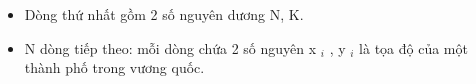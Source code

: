 \begin{itemize}
	\item Dòng thứ nhất gồm 2 số nguyên dương N, K.
	\item N dòng tiếp theo: mỗi dòng chứa 2 số nguyên x $_ i $ , y $_ i $ là tọa độ của một thành phố trong vương quốc.
\end{itemize}